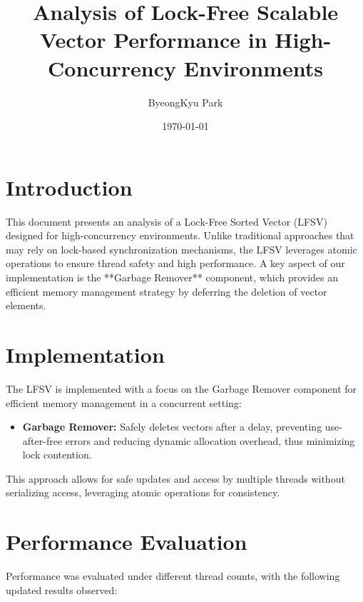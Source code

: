 \documentclass{article}
\title{Analysis of Lock-Free Scalable Vector Performance in High-Concurrency Environments}
\author{ByeongKyu Park}
\date{\today}
\begin{document}
\maketitle

\section{Introduction}
This document presents an analysis of a Lock-Free Sorted Vector (LFSV) designed for high-concurrency environments. Unlike traditional approaches that may rely on lock-based synchronization mechanisms, the LFSV leverages atomic operations to ensure thread safety and high performance. A key aspect of our implementation is the **Garbage Remover** component, which provides an efficient memory management strategy by deferring the deletion of vector elements.

\section{Implementation}
The LFSV is implemented with a focus on the Garbage Remover component for efficient memory management in a concurrent setting:
\begin{itemize}
    \item \textbf{Garbage Remover:} Safely deletes vectors after a delay, preventing use-after-free errors and reducing dynamic allocation overhead, thus minimizing lock contention.
\end{itemize}
This approach allows for safe updates and access by multiple threads without serializing access, leveraging atomic operations for consistency.

\section{Performance Evaluation}
Performance was evaluated under different thread counts, with the following updated results observed:
\end{document}
